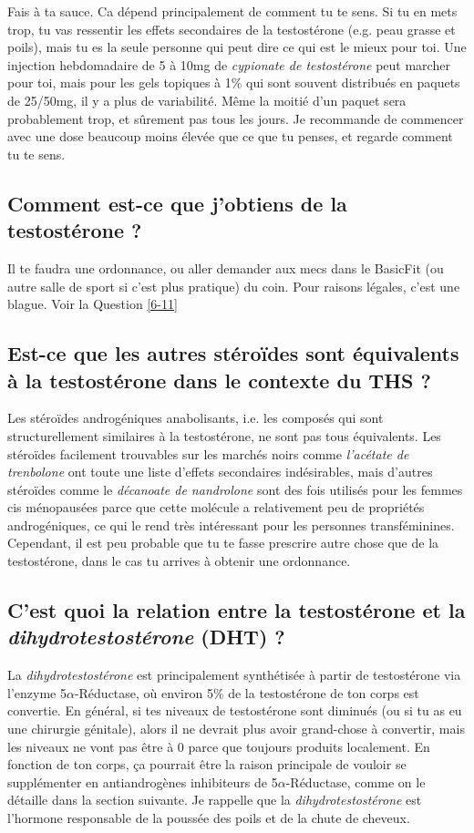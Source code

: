 \documentclass{article}
\begin{document}
Fais à ta sauce. Ca dépend principalement de comment tu te sens. Si tu en mets trop, tu vas ressentir les effets secondaires de la testostérone (e.g. peau grasse et poils), mais tu es la seule personne qui peut dire ce qui est le mieux pour toi. Une injection hebdomadaire de 5 à 10mg de \textit{cypionate de testostérone} peut marcher pour toi, mais pour les gels topiques à 1\% qui sont souvent distribués en paquets de 25/50mg, il y a plus de variabilité. Même la moitié d'un paquet sera probablement trop, et sûrement pas tous les jours. Je recommande de commencer avec une dose beaucoup moins élevée que ce que tu penses, et regarde comment tu te sens.

\subsection{Comment est-ce que j'obtiens de la testostérone ?}

Il te faudra une ordonnance, ou aller demander aux mecs dans le BasicFit (ou autre salle de sport si c'est plus pratique) du coin. Pour raisons légales, c'est une blague. Voir la Question \ref{6-11}

\subsection{Est-ce que les autres stéroïdes sont équivalents à la testostérone dans le contexte du THS ?}

Les stéroïdes androgéniques anabolisants, i.e. les composés qui sont structurellement similaires à la testostérone, ne sont pas tous équivalents. Les stéroïdes facilement trouvables sur les marchés noirs comme \textit{l'acétate de trenbolone} ont toute une liste d'effets secondaires indésirables, mais d'autres stéroïdes comme le \textit{décanoate de nandrolone} sont des fois utilisés pour les femmes cis ménopausées parce que cette molécule a relativement peu de propriétés androgéniques, ce qui le rend très intéressant pour les personnes transféminines. Cependant, il est peu probable que tu te fasse prescrire autre chose que de la testostérone, dans le cas tu arrives à obtenir une ordonnance.

\subsection{C'est quoi la relation entre la testostérone et la \textit{dihydrotestostérone} (DHT) ?}

La \textit{dihydrotestostérone} est principalement synthétisée à partir de testostérone via l'enzyme 5$\alpha$-Réductase, où environ 5\% de la testostérone de ton corps est convertie. En général, si tes niveaux de testostérone sont diminués (ou si tu as eu une chirurgie génitale), alors il ne devrait plus avoir grand-chose à convertir, mais les niveaux ne vont pas être à 0 parce que toujours produits localement. En fonction de ton corps, ça pourrait être la raison principale de vouloir se supplémenter en antiandrogènes inhibiteurs de 5$\alpha$-Réductase, comme on le détaille dans la section suivante. Je rappelle que la \textit{dihydrotestostérone} est l'hormone responsable de la poussée des poils et de la chute de cheveux.
\end{document}
